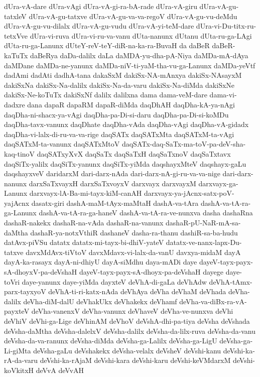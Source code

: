 {dUra-vA-dare
dUra-vAgi
dUra-vA-gi-ra-bA-rade
dUra-vA-giru
dUra-vA-gu-tatxleV
dUra-vA-gu-tatxve
dUra-vA-gu-va-va-regoV
dUra-vA-gu-vu-deMdu
dUra-vA-gu-vu-dilalx
dUra-vA-gu-vudu
dUra-vA-yi-teM-dare
dUra-vi-Du-titx-ru-tetxVve
dUra-vi-ruva
dUra-vi-ru-va-vanu
dUta-nanunx
dUtanu
dUta-ru-ga-LAgi
dUta-ru-ga-Lanunx
dUteY-reV-teY-diR-na-ka-ra-BuvaH
da
daBeR
daBeR-kaTuTx
daBeRya
daDa-dalilx
daLa
daMDA-yu-dha-pA-Niya
daMDa-mA-dAya
daMDane
daMDa-ne-yanunx
daMDa-niV-ti-yaM-tha-vu-ga-Lanunx
daMDa-yeVtf
dadAmi
dadAti
dadhA-tana
dakaSxM
dakiSx-NA-mAnxya
dakiSx-NAsayxM
dakiSxNa
dakiSx-Na-dalilx
dakiSx-Na-da-varu
dakiSx-Na-diMda
dakiSxNe
dakiSx-Ne-koTuTx
dakiSxNf
dalilx
dalilxna
dama
dama-veM-dare
dama-vi-dadxre
dana
dapaR
dapaRM
dapaR-diMda
daqDhAH
daqDha-kA-ya-nAgi
daqDha-ni-shacx-ya-vAgi
daqDha-pa-Di-si-daru
daqDha-pa-Di-si-koMDu
daqDha-tavx-vanunx
daqDhate
daqDha-vAda
daqDha-vAgi
daqDha-vA-gidadx
daqDha-vi-lalx-di-ru-va-va-rige
daqSATx
daqSATxMta
daqSATxM-ta-vAgi
daqSATxM-ta-vanunx
daqSATxMtoV
daqSATx-daq-SaTx-ma-toV-pa-deV-sha-kaq-tinoV
daqSATxyXvX
daqSaTx
daqSaTxH
daqSaTxnoV
daqSaTxtavx
daqSiTx-yalilx
daqSiTx-yanunx
daqSiTx-yiMda
daqshayxMteV
daqshayx-gaLu
daqshayxveV
daridarxM
dari-darx-nAda
dari-darx-nA-gi-ru-va-va-nige
dari-darx-nanunx
darxSaTxvayxH
darxSaTxvoyxV
darxvayx
darxvayxM
darxvayx-ga-Lanunx
darxvayx-lA-Ba-mi-tayx-kiM-canAH
darxvayx-ya-jAcnx-satx-poV-yajAcnx
dasatx-giri
dashA-maM-tAyx-maMtaH
dashA-va-tAra
dashA-va-tA-ra-ga-Lanunx
dashA-va-tA-ra-ga-haneV
dashA-va-tA-ra-ve-nunxva
dasha
dashaRna
dashaR-nakekx
dashaR-na-vAda
dashaR-na-vanunx
dashaR-pU-NaR-mA-sa-daMtha
dashaR-ya-notxVthiR
dashaneV
dasha-ra-thanu
dashiR-sa-ba-hudu
datAvx-piVSu
datatx
datatx-mi-tayx-bi-dhiV-yateV
datatx-ve-nanx-lapx-Du-tatxve
davxMdAvx-tiVtoV
davxMdavx-vi-lalx-da-vanU
davxya-midaM
dayA
dayA-ka-rasayx
dayA-ni-dhiyU
dayA-siMdhu
daya-mADi
daye
dayeV-tayx-payx-sA-dhoyxV-pa-deVshaH
dayeV-tayx-payx-sA-dhoyx-pa-deVshaH
dayege
daye-toVri
daye-yanunx
daye-yiMda
dayxteV
deVhA-di-gaLa
deVhAdw
deVhA-tAmx-parx-tayxyoV
deVhA-ti-ri-katx-nAda
deVhAya
deVha
deVhaM
deVhada
deVha-dalilx
deVha-diM-dalU
deVhakUkx
deVhakekx
deVhamf
deVha-va-diBx-ra-vA-payxteV
deVha-vanenxV
deVha-vanunx
deVhaveV
deVha-ve-nunxva
deVhi
deVhiV
deVhi-ga-Lige
deVhinAM
deVhoV
deVshA-dhi-pa-tiya
deVsha
deVshada
deVsha-daMtha
deVsha-dalelxV
deVsha-dalilx
deVsha-da-lilx-ruva
deVsha-da-vanu
deVsha-da-va-ranunx
deVsha-diMda
deVsha-ga-Lalilx
deVsha-ga-LigU
deVsha-ga-Li-giMta
deVsha-gaLu
deVshakekx
deVsha-velalx
deVsheV
deVshi-kanu
deVshi-ka-rA-da-varu
deVshi-ka-rAjaM
deVshi-kara
deVshi-karu
deVshi-keVMdarxM
deVshi-koVkitxH
deVvA
deVvAH
}
